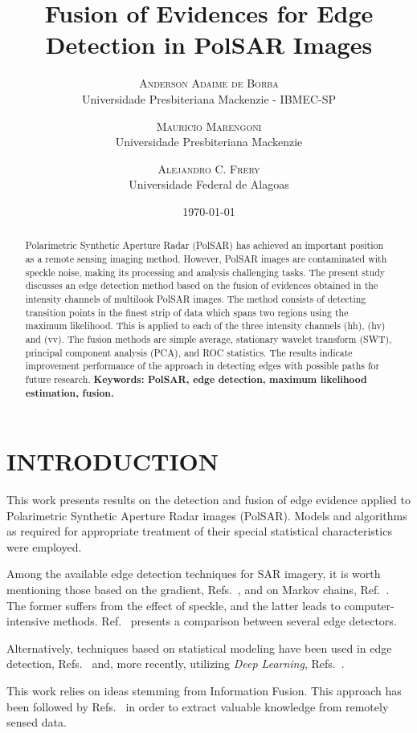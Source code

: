 \documentclass[a4paper,12pt]{article}
\title{Fusion of Evidences for Edge Detection in PolSAR Images }
\author{%
	\textsc{Anderson Adaime de Borba}\\ %
	\normalsize Universidade Presbiteriana Mackenzie - IBMEC-SP \\ %
	\and
	\textsc{Mauricio Marengoni}\\%
	\normalsize Universidade Presbiteriana Mackenzie \\ %
        \and
	\textsc{Alejandro C. Frery}\\%
	\normalsize Universidade Federal de Alagoas \\ %
}
\date{\today}
\begin{document}
	\maketitle
	\begin{abstract}
Polarimetric Synthetic Aperture Radar (PolSAR) has achieved an important position as a remote sensing imaging method. 
However, PolSAR images are contaminated with speckle noise, making its processing and analysis challenging tasks. 
The present study discusses an edge detection method based on the fusion of evidences obtained in the intensity channels of multilook PolSAR images.
The method consists of detecting transition points in the finest strip of data which spans two regions using the maximum likelihood.
This is applied to each of the three intensity channels (hh), (hv) and (vv). 
The fusion methods are simple average, stationary wavelet transform (SWT), principal component analysis (PCA), and ROC statistics.  
The results indicate improvement performance of the approach in detecting edges with possible paths for future research.
		\textbf{Keywords: PolSAR, edge detection, maximum likelihood estimation, fusion.} 
	\end{abstract}
	
	\section{INTRODUCTION} \label{sec:introduction}
		  This work presents results on the detection and fusion of edge evidence applied to Polarimetric Synthetic Aperture Radar images (PolSAR). Models and algorithms as required for appropriate treatment of their special statistical characteristics were employed.

Among the available edge detection techniques for SAR imagery, it is worth mentioning those based on the gradient, Refs.~\cite{tlb, obw, flmc, fyf}, and on Markov chains, Ref.~\cite{bf}. The former suffers from the effect of speckle, and the latter leads to computer-intensive methods. Ref.~\cite{gfn} presents a comparison between several edge detectors. 

Alternatively, techniques based on statistical modeling have been used in edge detection, Refs.~\cite{gmbf, fbgm, horrit, gfn} and, more recently,  utilizing \textit{Deep Learning}, Refs.~\cite{bac, ztmxzxf, tabmm, xstz}.

This work relies on ideas stemming from Information Fusion.
This approach has been followed by Refs.~\cite{sglmla,sg} in order to extract valuable knowledge from remotely sensed data.
\end{document}
